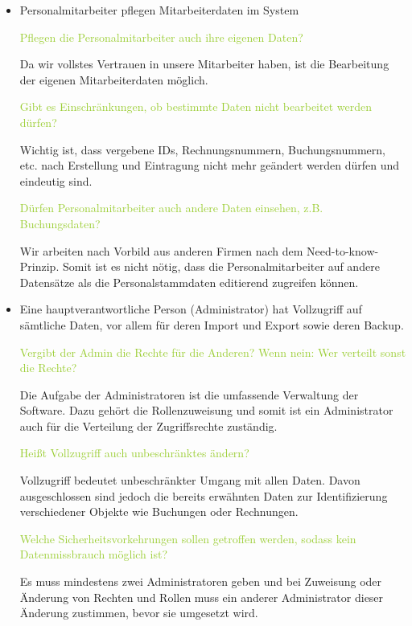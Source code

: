 \begin{itemize}
    \item Personalmitarbeiter pflegen Mitarbeiterdaten im System  
    
    \textcolor{YellowGreen}{Pflegen die Personalmitarbeiter auch ihre eigenen Daten?}

    \textcolor{NavyBlue}{Da wir vollstes Vertrauen in unsere Mitarbeiter haben, ist die Bearbeitung der eigenen Mitarbeiterdaten möglich.}

    \textcolor{YellowGreen}{Gibt es Einschränkungen, ob bestimmte Daten nicht bearbeitet werden dürfen?}

    \textcolor{NavyBlue}{Wichtig ist, dass vergebene IDs, Rechnungsnummern, Buchungsnummern, etc. nach Erstellung und Eintragung nicht mehr geändert werden dürfen und eindeutig sind. }

    \textcolor{YellowGreen}{Dürfen Personalmitarbeiter auch andere Daten einsehen, z.B. Buchungsdaten?}

    \textcolor{NavyBlue}{Wir arbeiten nach Vorbild aus anderen Firmen nach dem Need-to-know-Prinzip. Somit ist es nicht nötig, dass die Personalmitarbeiter auf andere Datensätze als die Personalstammdaten editierend zugreifen können.}

    \item Eine hauptverantwortliche Person (Administrator) hat Vollzugriff auf sämtliche Daten, vor allem für deren Import und Export sowie deren Backup. 
    
    \textcolor{YellowGreen}{Vergibt der Admin die Rechte für die Anderen? Wenn nein: Wer verteilt sonst die Rechte?}

    \textcolor{NavyBlue}{Die Aufgabe der Administratoren ist die umfassende Verwaltung der Software. Dazu gehört die Rollenzuweisung und somit ist ein Administrator auch für die Verteilung der Zugriffsrechte zuständig.}

    \textcolor{YellowGreen}{Heißt Vollzugriff auch unbeschränktes ändern?}

    \textcolor{NavyBlue}{Vollzugriff bedeutet unbeschränkter Umgang mit allen Daten. Davon ausgeschlossen sind jedoch die bereits erwähnten Daten zur Identifizierung verschiedener Objekte wie Buchungen oder Rechnungen.}

    \textcolor{YellowGreen}{Welche Sicherheitsvorkehrungen sollen getroffen werden, sodass kein Datenmissbrauch möglich ist?}

    \textcolor{NavyBlue}{Es muss mindestens zwei Administratoren geben und bei Zuweisung oder Änderung von Rechten und Rollen muss ein anderer Administrator dieser Änderung zustimmen, bevor sie umgesetzt wird.}


\end{itemize}

